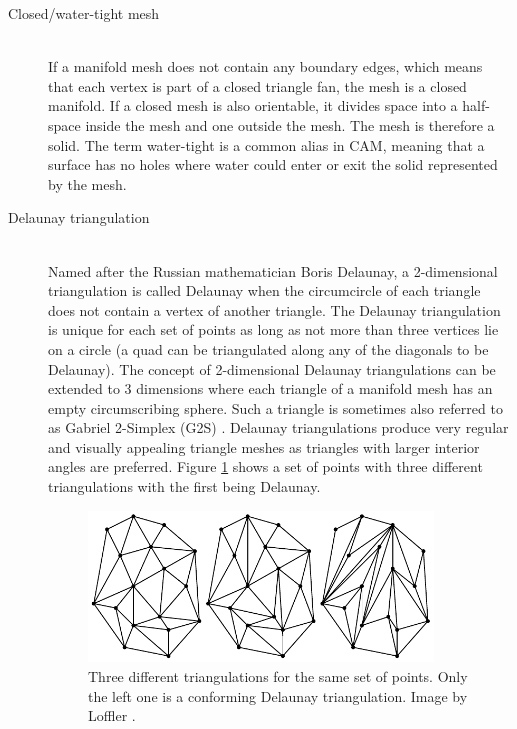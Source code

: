 \begin{description}
	
	\item[Closed/water-tight mesh] \hfill \\
	If a manifold mesh does not contain any boundary edges, which means that each vertex is part of a closed triangle fan, the mesh is a closed manifold.
	If a closed mesh is also orientable, it divides space into a half-space inside the mesh and one outside the mesh.
	The mesh is therefore a solid.
	The term water-tight is a common alias in CAM, meaning that a surface has no holes where water could enter or exit the solid represented by the mesh.
	
	
	
	
	\item[Delaunay triangulation] \hfill \\
	Named after the Russian mathematician Boris Delaunay, a 2-dimensional triangulation is called Delaunay when the circumcircle of each triangle does not contain a vertex of another triangle.
	The Delaunay triangulation is unique for each set of points as long as not more than three vertices lie on a circle (\eg a quad can be triangulated along any of the diagonals to be Delaunay).
	The concept of 2-dimensional Delaunay triangulations can be extended to 3 dimensions where each triangle of a manifold mesh has an empty circumscribing sphere.
	Such a triangle is sometimes also referred to as Gabriel 2-Simplex (G2S) \cite{g2s}.
	Delaunay triangulations produce very regular and visually appealing triangle meshes as triangles with larger interior angles are preferred.
	Figure \ref{fig:delaunay_triangulation} shows a set of points with three different triangulations with the first being Delaunay.
	
	\begin{figure}[H]
		\centering
		\includegraphics[width=0.9\textwidth]{images/delaunay_triangulation}
		\caption{
			Three different triangulations for the same set of points.
			Only the left one is a conforming Delaunay triangulation.
			Image by Loffler \protect\etal \cite{delaunay_image}.
		}
		\label{fig:delaunay_triangulation}
	\end{figure}
		

\end{description}
